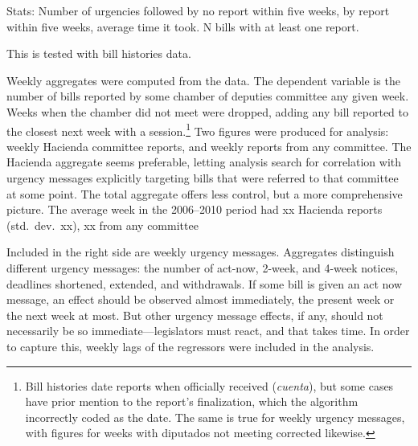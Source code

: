 \documentclass[letter,12pt]{article}
\begin{document}
Stats:
Number of urgencies followed by no report within five weeks, by report within five weeks, average time it took. 
N bills with at least one report. 

This is tested with bill histories data. 



Weekly aggregates were computed from the data. The dependent variable is the number of bills reported by some chamber of deputies committee any given week. Weeks when the chamber did not meet were dropped, adding any bill reported to the closest next week with a session.\footnote{Bill histories date reports when officially received (\emph{cuenta}), but some cases have prior mention to the report's finalization, which the algorithm incorrectly coded as the date. The same is true for weekly urgency messages, with figures for weeks with diputados not meeting corrected likewise.} Two figures were produced for analysis: weekly Hacienda committee reports, and weekly reports from any committee. The Hacienda aggregate seems preferable, letting analysis search for correlation with urgency messages explicitly targeting bills that were referred to that committee at some point. The total aggregate offers less control, but a more comprehensive picture. The average week in the 2006--2010 period had xx Hacienda reports (std.\ dev.\ xx), xx from any committee 

Included in the right side are weekly urgency messages. Aggregates distinguish different urgency messages: the number of act-now, 2-week, and 4-week notices, deadlines shortened, extended, and withdrawals. If some bill is given an act now message, an effect should be observed almost immediately, the present week or the next week at most. But other urgency message effects, if any, should not necessarily be so immediate---legislators must react, and that takes time. In order to capture this, weekly lags of the regressors were included in the analysis. 
\end{document}
